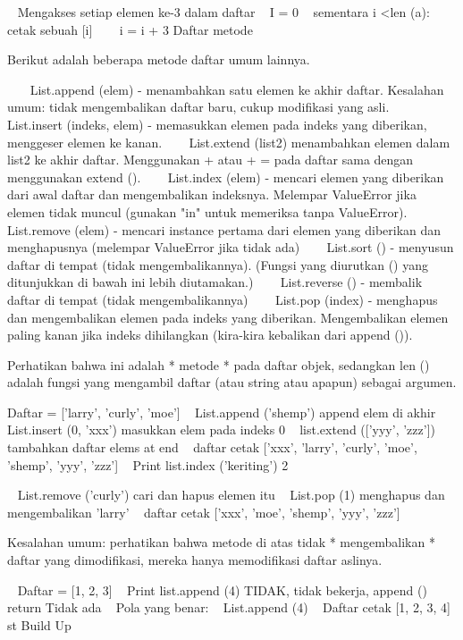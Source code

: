 ~            Mengakses setiap elemen ke-3 dalam daftar 
~ I = 0 
~ sementara i <len (a): 
~~~ cetak sebuah [i] 
~~~ i = i + 3 
Daftar metode 

Berikut adalah beberapa metode daftar umum lainnya. 

~~~ List.append (elem) - menambahkan satu elemen ke akhir daftar. Kesalahan umum: tidak mengembalikan daftar baru, cukup modifikasi yang asli. 
~~~ List.insert (indeks, elem) - memasukkan elemen pada indeks yang diberikan, menggeser elemen ke kanan. 
~~~ List.extend (list2) menambahkan elemen dalam list2 ke akhir daftar. Menggunakan + atau + = pada daftar sama dengan menggunakan extend (). 
~~~ List.index (elem) - mencari elemen yang diberikan dari awal daftar dan mengembalikan indeksnya. Melempar ValueError jika elemen tidak muncul (gunakan "in" untuk memeriksa tanpa ValueError). 
~~~ List.remove (elem) - mencari instance pertama dari elemen yang diberikan dan menghapusnya (melempar ValueError jika tidak ada) 
~~~ List.sort () - menyusun daftar di tempat (tidak mengembalikannya). (Fungsi yang diurutkan () yang ditunjukkan di bawah ini lebih diutamakan.) 
~~~ List.reverse () - membalik daftar di tempat (tidak mengembalikannya) 
~~~ List.pop (index) - menghapus dan mengembalikan elemen pada indeks yang diberikan. Mengembalikan elemen paling kanan jika indeks dihilangkan (kira-kira kebalikan dari append ()). 

Perhatikan bahwa ini adalah * metode * pada daftar objek, sedangkan len () adalah fungsi yang mengambil daftar (atau string atau apapun) sebagai argumen. 


Daftar = ['larry', 'curly', 'moe'] 
~ List.append ('shemp')            append elem di akhir 
~ List.insert (0, 'xxx')            masukkan elem pada indeks 0 
~ list.extend (['yyy', 'zzz'])            tambahkan daftar elems at end 
~ daftar cetak            ['xxx', 'larry', 'curly', 'moe', 'shemp', 'yyy', 'zzz'] 
~ Print list.index ('keriting')            2 

~ List.remove ('curly')            cari dan hapus elemen itu 
~ List.pop (1)            menghapus dan mengembalikan 'larry' 
~ daftar cetak            ['xxx', 'moe', 'shemp', 'yyy', 'zzz'] 

Kesalahan umum: perhatikan bahwa metode di atas tidak * mengembalikan * daftar yang dimodifikasi, mereka hanya memodifikasi daftar aslinya. 

~ Daftar = [1, 2, 3] 
~ Print list.append (4)            TIDAK, tidak bekerja, append () return Tidak ada 
~            Pola yang benar: 
~ List.append (4) 
~ Daftar cetak            [1, 2, 3, 4] 
st Build Up 

